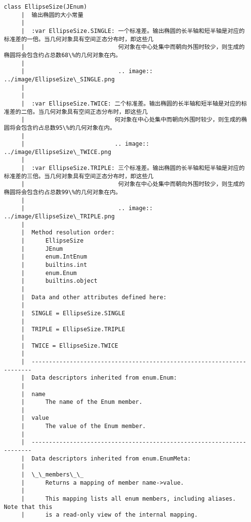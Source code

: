 \documentclass[11pt]{article}
\begin{document}
\begin{Verbatim}[commandchars=\\\{\}]
    class EllipseSize(JEnum)
     |  输出椭圆的大小常量
     |  
     |  :var EllipseSize.SINGLE: 一个标准差。输出椭圆的长半轴和短半轴是对应的标准差的一倍。当几何对象具有空间正态分布时，即这些几
     |                           何对象在中心处集中而朝向外围时较少，则生成的椭圆将会包含约占总数68\%的几何对象在内。
     |  
     |                           .. image:: ../image/EllipseSize\_SINGLE.png
     |  
     |  
     |  :var EllipseSize.TWICE: 二个标准差。输出椭圆的长半轴和短半轴是对应的标准差的二倍。当几何对象具有空间正态分布时，即这些几
     |                          何对象在中心处集中而朝向外围时较少，则生成的椭圆将会包含约占总数95\%的几何对象在内。
     |  
     |                          .. image:: ../image/EllipseSize\_TWICE.png
     |  
     |  :var EllipseSize.TRIPLE: 三个标准差。输出椭圆的长半轴和短半轴是对应的标准差的三倍。当几何对象具有空间正态分布时，即这些几
     |                           何对象在中心处集中而朝向外围时较少，则生成的椭圆将会包含约占总数99\%的几何对象在内。
     |  
     |                           .. image:: ../image/EllipseSize\_TRIPLE.png
     |  
     |  Method resolution order:
     |      EllipseSize
     |      JEnum
     |      enum.IntEnum
     |      builtins.int
     |      enum.Enum
     |      builtins.object
     |  
     |  Data and other attributes defined here:
     |  
     |  SINGLE = EllipseSize.SINGLE
     |  
     |  TRIPLE = EllipseSize.TRIPLE
     |  
     |  TWICE = EllipseSize.TWICE
     |  
     |  ----------------------------------------------------------------------
     |  Data descriptors inherited from enum.Enum:
     |  
     |  name
     |      The name of the Enum member.
     |  
     |  value
     |      The value of the Enum member.
     |  
     |  ----------------------------------------------------------------------
     |  Data descriptors inherited from enum.EnumMeta:
     |  
     |  \_\_members\_\_
     |      Returns a mapping of member name->value.
     |      
     |      This mapping lists all enum members, including aliases. Note that this
     |      is a read-only view of the internal mapping.
    

\end{Verbatim}
\end{document}
